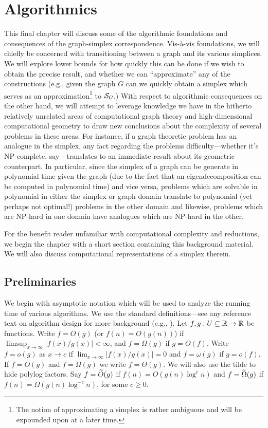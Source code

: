 \chapter{Algorithmics}
\label{chap:algorithmics}

This final chapter will discuss some of the algorithmic foundations and consequences of the graph-simplex correspondence. Vis-\`{a}-vis foundations, we will chiefly be concerned with transitioning between a graph and its various simplices. We will explore lower bounds for how quickly this can be done if we wish to obtain the precise result, and whether we can ``approximate'' any of the constructions (e.g., given the graph $G$ can we quickly obtain a simplex which serves as an approximation\footnote{The notion of approximating a simplex is rather ambiguous and will be expounded upon at a later time.} to $\mathcal{S}_G$.) With respect to algorithmic consequences on the other hand, we will attempt to leverage knowledge we have in the hitherto relatively unrelated areas of computational graph theory and high-dimensional computational geometry to draw new conclusions about the complexity of several problems in these areas. For instance, if a  graph theoretic problem has an analogue in the simplex, any fact regarding the problems difficulty---whether it's NP-complete, say---translates to an immediate result about its geometric counterpart. In particular, since the simplex of a graph can be generate in polynomial time given the graph (due to the fact that an eigendecomposition can be computed in polynomial time) and vice versa, problems which are solvable in polynomial in either the simplex or graph domain  translate to polynomial (yet perhaps not optimal!) problems in the other domain and likewise, problems which are NP-hard in one domain have analogues which are NP-hard in the other. 

For the benefit reader unfamiliar with computational complexity and reductions, we begin the chapter with a short section containing this background material. We will also discuss computational representations of a simplex therein. 

\section{Preliminaries}

We begin with asymptotic notation which will be used to analyze the running time of various algorithms. We use the standard definitions---see any reference text on algorithm design for more background (e.g., \cite{kleinberg2006algorithm}). Let $f,g:U\subseteq \mathbb{R} \to \mathbb{R}$ be functions. Write $f=O(g)$ (or $f(n)=O(g(n))$) if $\limsup_{x\to \infty}|f(x)/g(x)|<\infty$, and $f=\Omega(g)$ if $g=O(f)$. Write $f=o(g)$ as $x\to c$ if $\lim_{x\to \infty}|f(x)/g(x)|=0$ and $f=\omega(g)$ if $g=o(f)$. If $f=O(g)$ and $f=\Omega(g)$ we write $f=\Theta(g)$. We will also use the tilde to hide polylog factors. Say $f=\widetilde{O}(g)$ if $f(n) = O(g(n) \log^c n)$ and $f=\widetilde{\Omega}(g)$ if $f(n) = \Omega(g(n) \log^{-c}n)$, for some $c\geq 0$. 


